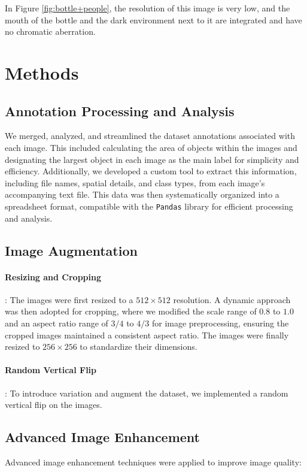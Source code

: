 \documentclass{article} %
\begin{document}
In Figure \ref{fig:bottle+people}, the resolution of this image is very low, and the mouth of the bottle and the dark environment next to it are integrated and have no chromatic aberration.

\section{Methods}
\subsection{Annotation Processing and Analysis}
We merged, analyzed, and streamlined the dataset annotations associated with each image. This included calculating the area of objects within the images and designating the largest object in each image as the main label for simplicity and efficiency. Additionally, we developed a custom tool to extract this information, including file names, spatial details, and class types, from each image's accompanying text file. This data was then systematically organized into a spreadsheet format, compatible with the \texttt{Pandas} library for efficient processing and analysis.


\subsection{Image Augmentation}
\paragraph{Resizing and Cropping}: The images were first resized to a \(512 \times 512\) resolution. A dynamic approach was then adopted for cropping, where we modified the scale range of \(0.8\) to \(1.0\) and an aspect ratio range of \(3/4\) to \(4/3\) for image preprocessing, ensuring the cropped images maintained a consistent aspect ratio. The images were finally resized to \(256 \times 256\) to standardize their dimensions.


\paragraph{Random Vertical Flip}: To introduce variation and augment the dataset, we implemented a random vertical flip on the images.


\subsection{Advanced Image Enhancement}
Advanced image enhancement techniques were applied to improve image quality:
\end{document}
